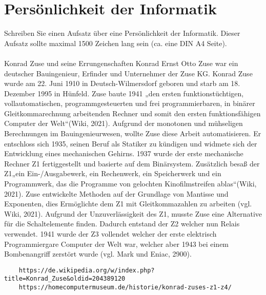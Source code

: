 \section{Persönlichkeit der Informatik}
Schreiben Sie einen Aufsatz über eine Persönlichkeit der Informatik. Dieser Aufsatz sollte maximal 1500 Zeichen lang sein (ca. eine DIN A4 Seite).\\
\\
Konrad Zuse und seine Errungenschaften
Konrad Ernst Otto Zuse war ein deutscher Bauingenieur, Erfinder und Unternehmer der Zuse KG. Konrad Zuse wurde am 22. Juni 1910 in Deutsch-Wilmersdorf geboren und starb am 18. Dezember 1995 in Hünfeld. Zuse baute 1941 „den ersten funktionstüchtigen, vollautomatischen, programmgesteuerten und frei programmierbaren, in binärer Gleitkommarechnung arbeitenden Rechner und somit den ersten funktionsfähigen Computer der Welt“(Wiki, 2021).
Aufgrund der monotonen und mühseligen Berechnungen im Bauingenieurwesen, wollte Zuse diese Arbeit automatisieren. Er entschloss sich 1935, seinen Beruf als Statiker zu kündigen und widmete sich der Entwicklung eines mechanischen Gehirns. 1937 wurde der erste mechanische Rechner Z1 fertiggestellt und basierte auf dem Binärsystem. Zusätzlich besaß der Z1„ein Ein-/Ausgabewerk, ein Rechenwerk, ein Speicherwerk und ein Programmwerk, das die Programme von gelochten Kinofilmstreifen ablas“(Wiki, 2021). Zuse entwickelte Methoden auf der Grundlage von Mantisse und Exponenten, dies Ermöglichte dem Z1 mit Gleitkommazahlen zu arbeiten (vgl. Wiki, 2021). Aufgrund der Unzuverlässigkeit des Z1, musste Zuse eine Alternative für die Schaltelemente finden.  Dadurch entstand der Z2 welcher nun Relais verwendet. 1941 wurde der Z3 vollendet welcher der erste elektrisch Programmiergare Computer der Welt war, welcher aber 1943 bei einem Bombenangriff zerstört wurde (vgl. Mark und Eniac, 2900).

\begin{lstlisting}
	https://de.wikipedia.org/w/index.php?title=Konrad_Zuse&oldid=204389120
	https://homecomputermuseum.de/historie/konrad-zuses-z1-z4/
\end{lstlisting}